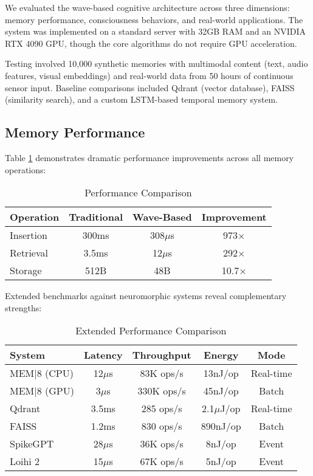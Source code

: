 \documentclass[11pt,letterpaper]{article}
\begin{document}
We evaluated the wave-based cognitive architecture across three dimensions: memory performance, consciousness behaviors, and real-world applications. The system was implemented on a standard server with 32GB RAM and an NVIDIA RTX 4090 GPU, though the core algorithms do not require GPU acceleration.

Testing involved 10,000 synthetic memories with multimodal content (text, audio features, visual embeddings) and real-world data from 50 hours of continuous sensor input. Baseline comparisons included Qdrant (vector database), FAISS (similarity search), and a custom LSTM-based temporal memory system.

\subsection{Memory Performance}

Table \ref{tab:performance} demonstrates dramatic performance improvements across all memory operations:

\begin{table}[htbp]
\caption{Performance Comparison}
\label{tab:performance}
\centering
\begin{tabular}{@{}lccc@{}}
\toprule
Operation & Traditional & Wave-Based & Improvement \\
\midrule
Insertion & 300ms & 308$\mu$s & 973$\times$ \\
Retrieval & 3.5ms & 12$\mu$s & 292$\times$ \\
Storage & 512B & 48B & 10.7$\times$ \\
\bottomrule
\end{tabular}
\end{table}

Extended benchmarks against neuromorphic systems reveal complementary strengths:

\begin{table}[h]
\caption{Extended Performance Comparison}
\label{tab:extended-perf}
\centering
\footnotesize
\begin{tabular}{@{}lcccc@{}}
\toprule
System & Latency & Throughput & Energy & Mode \\
\midrule
MEM|8 (CPU) & 12$\mu$s & 83K ops/s & 13nJ/op & Real-time \\
MEM|8 (GPU) & 3$\mu$s & 330K ops/s & 45nJ/op & Batch \\
Qdrant & 3.5ms & 285 ops/s & 2.1$\mu$J/op & Real-time \\
FAISS & 1.2ms & 830 ops/s & 890nJ/op & Batch \\
SpikeGPT & 28$\mu$s & 36K ops/s & 8nJ/op & Event \\
Loihi 2 & 15$\mu$s & 67K ops/s & 5nJ/op & Event \\
\bottomrule
\end{tabular}
\end{table}
\end{document}
